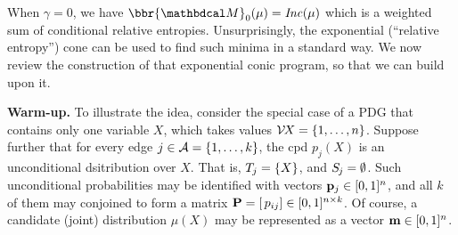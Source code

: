 \documentclass[twoside]{article}
\begin{document}
When $\gamma = 0$, we have $\bbr{\dg M}_0(\mu)= \Inc(\mu)$ which is a weighted sum of conditional relative entropies.
Unsurprisingly, the exponential (``relative entropy'') cone can be used to find such minima in a standard way.
We now review the construction of that exponential conic program,
    so that we can build upon it.

\textbf{Warm-up.}
\begingroup 
To illustrate the idea, consider the special case of a PDG that
contains only one variable $X$, which takes values $\mathcal V\mskip-2mu X = \{1, \ldots, n\}$.
Suppose further that for every edge $j \in \mathcal A = \{1, \ldots, k\}$, the cpd $p_j(X)$ is an unconditional dsitribution over $X$.
That is, $\Tgt j = \{ X \}$, and $\Src j = \emptyset$.
Such unconditional probabilities may be identified with vectors $\mathbf{p}_j \in [0,1]^n$, and all $k$ of them may conjoined to form a
matrix $\mathbf{P} = [\,p_{ij}] \in [0,1]^{n \times k}$.
Of course, a candidate (joint) distribution $\mu(X)$
may be represented as a vector $\mathbf{m} \in [0,1]^n$.
%
\end{document}
